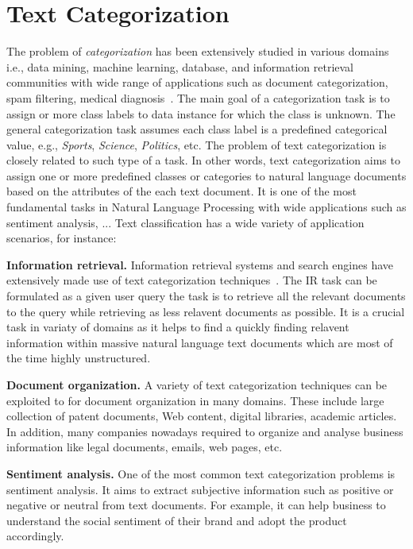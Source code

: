 \section{Text Categorization} \label{cha:foundations_basics_text_cat}
The problem of \textit{categorization} has been extensively studied in various domains i.e., data mining, machine learning, database, and information retrieval communities with wide range of applications such as document categorization, spam filtering, medical diagnosis~\cite{book_survey_text_class_algorithms}. The main goal of a categorization task is to assign or more class labels to data instance for which the class is unknown. The general categorization task assumes each class label is a predefined categorical value, e.g., \textit{Sports}, \textit{Science}, \textit{Politics}, etc. The problem of text categorization is closely related to such type of a task. In other words, text categorization aims to assign one or more predefined classes or categories to natural language documents based on the attributes of the each text document. It is one of the most fundamental tasks in Natural Language Processing with wide applications such as sentiment analysis, ... %
Text classification
has a wide variety of application scenarios, for instance: \newline%

\textbf{Information retrieval.}
Information retrieval systems and search engines have extensively made use of text categorization techniques~\cite{survey}. The IR task can be formulated as a given user query the task is to retrieve all the relevant documents to the query while retrieving as less relavent documents as possible. It is a crucial task in variaty of domains as it helps to find a quickly finding relavent information within massive natural language text documents which are most of the time highly unstructured. 


\textbf{Document organization.}
A variety of text categorization techniques can be exploited to for document organization in many domains. These include large collection of patent documents, Web content, digital libraries, academic articles. In addition, many companies nowadays required to organize and analyse business information like legal documents, emails, web pages, etc. 

\textbf{Sentiment analysis.}
One of the most common text categorization problems is sentiment analysis. It aims to extract subjective information such as positive or negative or neutral from text documents. For example, it can help business to understand the social sentiment of their brand and adopt the product accordingly.  

